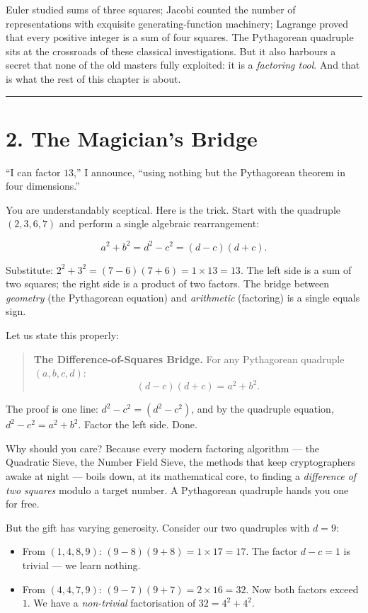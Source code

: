 Euler studied sums of three squares; Jacobi counted the number of representations with exquisite generating-function machinery; Lagrange proved that every positive integer is a sum of four squares. The Pythagorean quadruple sits at the crossroads of these classical investigations. But it also harbours a secret that none of the old masters fully exploited: it is a \emph{factoring tool}. And that is what the rest of this chapter is about.

\bigskip\noindent\rule{\linewidth}{0.4pt}\bigskip

\section{2. The Magician's Bridge}
``I can factor \(13\),'' I announce, ``using nothing but the Pythagorean theorem in four dimensions.''

You are understandably sceptical. Here is the trick. Start with the quadruple \((2, 3, 6, 7)\) and perform a single algebraic rearrangement:

\[a^2 + b^2 = d^2 - c^2 = (d - c)(d + c).\]

Substitute: \(2^2 + 3^2 = (7 - 6)(7 + 6) = 1 \times 13 = 13\). The left side is a sum of two squares; the right side is a product of two factors. The bridge between \emph{geometry} (the Pythagorean equation) and \emph{arithmetic} (factoring) is a single equals sign.

Let us state this properly:

\begin{quote}
\textbf{The Difference-of-Squares Bridge.} For any Pythagorean quadruple \((a, b, c, d)\): \[(d - c)(d + c) = a^2 + b^2.\]
\end{quote}

The proof is one line: \(d^2 - c^2 = (d^2 - c^2)\), and by the quadruple equation, \(d^2 - c^2 = a^2 + b^2\). Factor the left side. Done.

Why should you care? Because every modern factoring algorithm --- the Quadratic Sieve, the Number Field Sieve, the methods that keep cryptographers awake at night --- boils down, at its mathematical core, to finding a \emph{difference of two squares} modulo a target number. A Pythagorean quadruple hands you one for free.

But the gift has varying generosity. Consider our two quadruples with \(d = 9\):

\begin{itemize}
\tightlist
\item
  From \((1, 4, 8, 9)\): \((9 - 8)(9 + 8) = 1 \times 17 = 17\). The factor \(d - c = 1\) is trivial --- we learn nothing.
\item
  From \((4, 4, 7, 9)\): \((9 - 7)(9 + 7) = 2 \times 16 = 32\). Now both factors exceed \(1\). We have a \emph{non-trivial} factorisation of \(32 = 4^2 + 4^2\).
\end{itemize}

